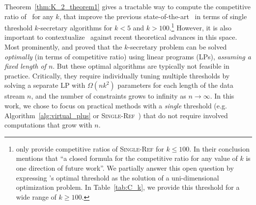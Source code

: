 
\label{connection_to_prior_work}
Theorem~\ref{thm:K_2_theorem1} gives a tractable way to compute the competitive ratio of \algoname\ for any $k$, that improve the previous state-of-the-art~\citep{albers2020new} in terms of single threshold $k$-secretary algorithms for $k<5$ and $k>100$.\footnote{\label{foot:closed_form}\citet{albers2020new} only provide competitive ratios of \textsc{Single-Ref} for $k \leq 100$. In their conclusion mentions that ``a closed formula for the competitive ratio for any value
of $k$ is one direction of future work''. We partially answer this open question by expressing \algoname's optimal threshold as the solution of a uni-dimensional optimization problem. In Table~\ref{tab:C_k}, we provide this threshold for a wide range of $k \geq 100$.} 
However, it is also important to contextualize \algoname\ against recent theoretical advances in this space. 
Most prominently, \citet{buchbinder2014secretary} and \citet{chan2014revealing} proved that the $k$-secretary problem can be solved {\em optimally} (in terms of competitive ratio) using linear programs (LPs), {\em assuming a fixed length of $n$}. But these optimal algorithms are typically not feasible in practice.
Critically, they require individually tuning multiple thresholds by solving a separate LP with $\Omega(n k^2)$ parameters for each length of the data stream $n$, and the number of constraints grows to infinity as  $n\rightarrow\infty$. 
In this work, we chose to focus on practical methods with a \emph{single} threshold (e.g. Algorithm~\ref{alg:virtual_plus} or \textsc{Single-Ref}~\citep{albers2020new}) that do not require involved computations that grow with $n$. 



